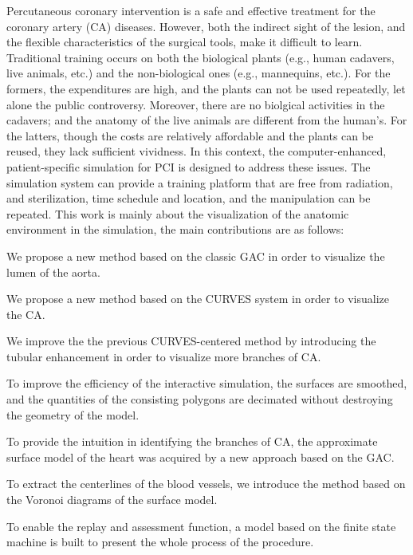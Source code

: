 
\begin{englishabstract}

Percutaneous coronary intervention is a safe and effective treatment for the coronary artery (CA) diseases.
However, both the indirect sight of the lesion, and the flexible characteristics of the surgical tools, make it difficult to learn. 
Traditional training occurs on both the biological plants (e.g., human cadavers, live animals, etc.) and the non-biological ones (e.g., mannequins, etc.). 
For the formers, the expenditures are high, and the plants can not be used repeatedly, let alone the public controversy. 
Moreover, there are no biolgical activities in the cadavers; and the anatomy of the live animals are different from the human's.
For the latters, though the costs are relatively affordable and the plants can be reused, they lack sufficient vividness. 
In this context, the computer-enhanced, patient-specific simulation for PCI is designed to address these issues. 
The simulation system can provide a training platform that are free from radiation, and sterilization, time schedule and location, and the manipulation can be repeated. 
This work is mainly about the visualization of the anatomic environment in the simulation, the main contributions are as follows: 

We propose a new method based on the classic GAC in order to visualize the lumen of the aorta. 

We propose a new method based on the CURVES system in order to visualize the CA. 

We improve the the previous CURVES-centered method by introducing the tubular enhancement in order to visualize more branches of CA.

To improve the efficiency of the interactive simulation, the surfaces are smoothed, and the quantities of the consisting polygons are decimated without destroying the geometry of the model.

To provide the intuition in identifying the branches of CA, the approximate surface model of the heart was acquired by a new approach based on the GAC. 

To extract the centerlines of the blood vessels, we introduce the method based on the Voronoi diagrams of the surface model. 

To enable the replay and assessment function, a model based on the finite state machine is built to present the whole process of the procedure.

%
\end{englishabstract}
